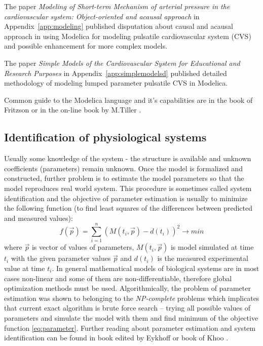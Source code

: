 The paper \cite{Kulhanek2014Modeling} \emph{Modeling of Short-term Mechanism of arterial pressure in the cardiovascular system: Object-oriented and acausal approach} in Appendix~\ref{app:modeling} published disputation about causal and acausal approach in using Modelica for modeling pulsatile cardiovascular system (CVS) and possible enhancement for more complex models. 

The paper \cite{Kulhanek2014mefanet} \emph{Simple Models of the Cardiovascular System for Educational and Research Purposes} in Appendix~\ref{app:simplemodelsd} published detailed methodology of modeling lumped parameter pulsatile CVS in Modelica. 

Common guide to the Modelica language and it's capabilities are in the book of Fritzson \cite{fritzson2002} or in the on-line book by M.Tiller \cite{Tiller2014}.


\subsection{Identification of physiological systems}
\label{sec:estimation}

Usually some knowledge of the system - the structure is available and unknown coefficients (parameters) remain unknown. Once the model is formalized and constructed, further problem is to estimate the model parameters so that the model reproduces real world system. This procedure is sometimes called system identification and the objective of parameter estimation is usually to minimize the following function (to find least squares of the differences between predicted and measured values):
\begin{equation} \label{eq:parameter} 
f( \vec{p} ) = \sum_{i=1}^{n} ( M(t_{i},\vec{p} ) - d(t_{i}) )^2 \to min  
\end{equation} 
where $\vec{p}$ is vector of values of parameters, $M(t_{i},\vec{p})$ is model simulated at time $t_{i} $ with the given parameter values $\vec{p}$ and $d(t_{i})$ is the measured experimental value at time $t_{i}$. 
In general mathematical models of biological systems are in most cases non-linear and some of them are non-differentiable, therefore global optimization methods must be used. Algorithmically, the problem of parameter estimation was shown to belonging to the \emph{NP-complete} problems \cite{Hofmann2005} which implicates that current exact algorithm is brute force search -- trying all possible values of parameters and simulate the model with them and find minimum of the objective function \ref{eq:parameter}.
Further reading about parameter estimation and system identification can be found in book edited by Eykhoff \cite{Eykhoff1981} or book of Khoo \cite[p.~159]{khoo2000}.

